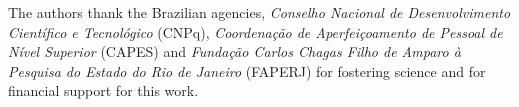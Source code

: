 \documentclass[conference,compsoc,fleqn]{IEEEtran}
\begin{document}

The authors thank the Brazilian agencies, \textit{Conselho Nacional de
	Desenvolvimento Científico e Tecnológico} (CNPq), \textit{Coordenação de
	Aperfeiçoamento de Pessoal de Nível Superior} (CAPES) and \textit{Fundação Carlos Chagas Filho de Amparo à Pesquisa do Estado do Rio de Janeiro}
(FAPERJ) for fostering
science and for financial support for this work.

\renewcommand{\refname}{\noindent{\fontfamily{phv}\selectfont\normalsize \textbf{REFERENCES}}} 



\end{document}
